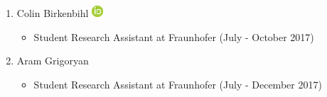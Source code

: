\documentclass[10pt,a4paper,sans]{moderncv} %
\begin{document}
\begin{enumerate}
        \item     Colin Birkenbihl {\scriptsize     \href{https://orcid.org/0000-0002-7212-7700}{\includegraphics[scale=0.5]{img/ORCIDiD_icon16x16}}
}    \begin{itemize}
        \item {\scriptsize Student Research Assistant at Fraunhofer (July - October 2017)}
    \end{itemize}

        \item     Aram Grigoryan     \begin{itemize}
        \item {\scriptsize Student Research Assistant at Fraunhofer (July - December 2017)}
    \end{itemize}

    \end{enumerate}
\end{document}

